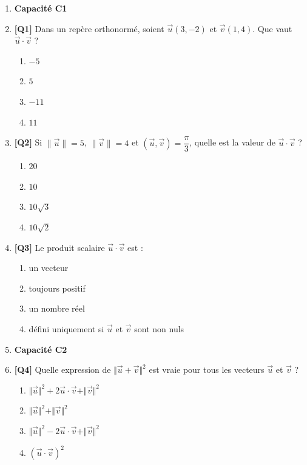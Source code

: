 \begin{enumerate}

\item[] \textbf{Capacité C1}

\item \textbf{[Q1]} Dans un repère orthonormé, soient $\vec{u}(3,-2)$ et $\vec{v}(1,4)$. Que vaut $\vec{u} \cdot \vec{v}$ ?
  \begin{enumerate}[label=\Alph*.]
    \item $-5$
    \item $5$
    \item $-11$
    \item $11$
  \end{enumerate}

\item \textbf{[Q2]} Si $\|\vec{u}\|=5$, $\|\vec{v}\|=4$ et $(\vec{u},\vec{v}) = \dfrac{\pi}{3}$, quelle est la valeur de $\vec{u} \cdot \vec{v}$ ?
  \begin{enumerate}[label=\Alph*.]
    \item $20$
    \item $10$
    \item $10\sqrt{3}$
    \item $10\sqrt{2}$
  \end{enumerate}

\item \textbf{[Q3]} Le produit scalaire $\vec{u} \cdot \vec{v}$ est :
  \begin{enumerate}[label=\Alph*.]
    \item un vecteur
    \item toujours positif
    \item un nombre réel
    \item défini uniquement si $\vec{u}$ et $\vec{v}$ sont non nuls
  \end{enumerate}

\item[] \textbf{Capacité C2}

\item \textbf{[Q4]} Quelle expression de $\Vert\vec{u}+\vec{v}\Vert^2$ est vraie pour tous les vecteurs $\vec u$ et $\vec v$ ?
  \begin{enumerate}[label=\Alph*.]
    \item $\Vert\vec{u}\Vert^2 + 2\vec{u}\cdot\vec{v} + \Vert\vec{v}\Vert^2$
    \item $\Vert\vec{u}\Vert^2 + \Vert\vec{v}\Vert^2$
    \item $\Vert\vec{u}\Vert^2 - 2\vec{u}\cdot\vec{v} + \Vert\vec{v}\Vert^2$
    \item $(\vec{u}\cdot\vec{v})^2$
  \end{enumerate}


\end{enumerate}

